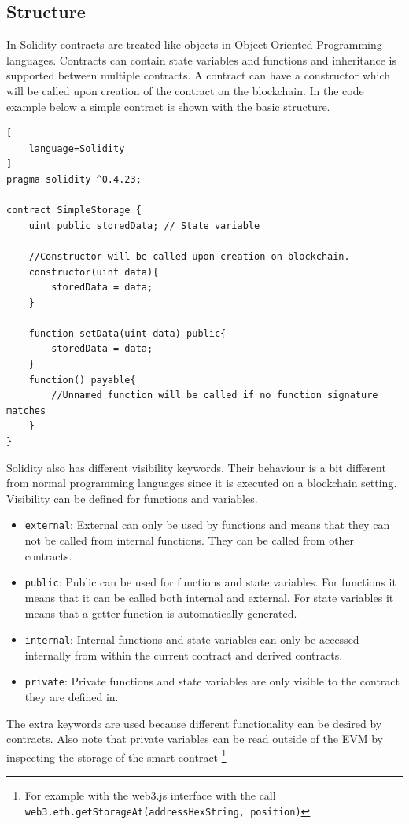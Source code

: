 \documentclass[a4paper]{article}
\begin{document}
\subsection{Structure}
In Solidity contracts are treated like objects in Object Oriented Programming languages. Contracts can contain state variables and functions and inheritance is supported between multiple contracts. A contract can have a constructor which will be called upon creation of the contract on the blockchain. In the code example below a simple contract is shown with the basic structure.
\begin{lstlisting}[
    language=Solidity
]
pragma solidity ^0.4.23;

contract SimpleStorage {
    uint public storedData; // State variable
    
    //Constructor will be called upon creation on blockchain.
    constructor(uint data){ 
        storedData = data;
    }
    
    function setData(uint data) public{
        storedData = data;
    }
    function() payable{
        //Unnamed function will be called if no function signature matches
    }
}
\end{lstlisting}
Solidity also has different visibility keywords. Their behaviour is a bit different from normal programming languages since it is executed on a blockchain setting. Visibility can be defined for functions and variables.
\begin{itemize}
    \item \texttt{external}: External can only be used by functions and means that they can not be called from internal functions. They can be called from other contracts.
    \item \texttt{public}: Public can be used for functions and state variables. For functions it means that it can be called both internal and external. For state variables it means that a getter function is automatically generated.
    \item \texttt{internal}: Internal functions and state variables can only be accessed internally from within the current contract and derived contracts.
    \item \texttt{private}: Private functions and state variables are only visible to the contract they are defined in.
\end{itemize}
The extra keywords are used because different functionality can be desired by contracts. Also note that private variables can be read outside of the EVM by inspecting the storage of the smart contract \footnote{For example with the web3.js interface with the call \texttt{web3.eth.getStorageAt(addressHexString, position)}}\\
\end{document}
